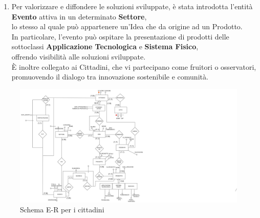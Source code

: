 \documentclass{article}
\begin{document}
\begin{par}
\begin{enumerate}
        \item Per valorizzare e diffondere le soluzioni sviluppate, è stata introdotta l’entità \textbf{Evento} attiva in un determinato \textbf{Settore},\\
        lo stesso al quale può appartenere un’Idea che da origine ad un Prodotto.\\
        In particolare, l’evento può ospitare la presentazione di prodotti delle sottoclassi \textbf{Applicazione Tecnologica} e \textbf{Sistema Fisico},\\
        offrendo visibilità alle soluzioni sviluppate.\\
        È inoltre collegato ai Cittadini, che vi partecipano come fruitori o osservatori, promuovendo il dialogo tra innovazione sostenibile e comunità.
    \end{enumerate}
    \end{par}

    \begin{figure}[H]
        
        \hspace{4cm}
        \includegraphics[width=13.7cm]{images/CITTADINI_COMPLETO.drawio.png}
        \caption{Schema E-R per i cittadini}
        \label{fig:schema-sostenibilita}
    \end{figure}
    
\end{document}
